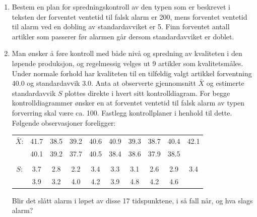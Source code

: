 \begin{enumerate}
\item
Bestem en plan for spredningskontroll av den typen som er beskrevet i
teksten der forventet ventetid til falsk alarm er 200, mens forventet
ventetid til alarm ved en dobling av standardavviket er 5.  Finn
forventet antall artikler som passerer før alarmen går dersom
standardavviket er doblet.
\item
Man ønsker å føre kontroll med både nivå og spredning
av kvaliteten i den løpende produksjon, og regelmessig velges ut 9
artikler som kvalitetsmåles.  Under normale forhold har kvaliteten
til en tilfeldig valgt artikkel forventning 40.0 og standardavvik 3.0.
Anta at observerte gjennomsnitt $\bar{X}$ og estimerte standardavvik 
$S$ plottes direkte i hvert sitt kontrolldiagram.  For begge 
kontrolldiagrammer ønsker en at forventet ventetid til falsk alarm
av typen forverring skal være ca. 100.  Fastlegg kontrollplaner i
henhold til dette. Følgende observasjoner foreligger:
\begin{center}
\begin{tabular}{cccccccccc}
 $\bar{X}$: &  41.7 & 38.5 & 39.2 & 40.6 & 40.9 & 39.3 & 38.7 & 40.4 & 42.1 \\
        &  40.1 & 39.2 & 37.7 & 40.5 & 38.4 & 38.6 & 37.9 & 38.5 &       \\
        &       &      &      &      &      &      &      &      &       \\ 
 $S$:      &   3.7 &  2.8 &  2.2 &  3.4 &  3.3 &  3.1 &  2.6 &  2.9 &  3.4  \\
        &   3.9 &  3.2 &  4.0 &  4.2 &  3.9 &  4.8 &  4.2 &  4.6 &
\end{tabular}
\end{center}
Blir det slått alarm i løpet av disse 17 tidspunktene, i så
fall når, og hva slags alarm?


\end{enumerate}
